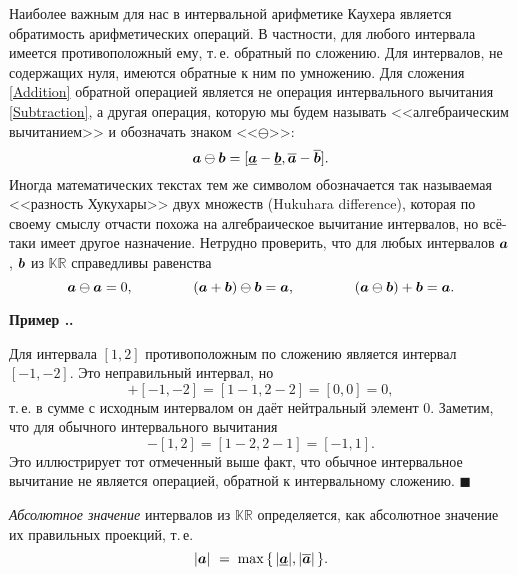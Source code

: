 \documentclass[a5paper,openany]{book}
\newcommand{\mbf}[1]{\protect\text{\boldmath$#1$}}
\newcommand{\mbb}{\mathbb}
\newcommand{\ov}{\overline}
\newcommand{\un}{\underline}
\newcounter{ExmpNum}[section]
\renewcommand{\theExmpNum}{\thesection.\arabic{ExmpNum}}
\newenvironment{example}%
  {\refstepcounter{ExmpNum}%
  \par\addvspace{\medskipamount} 
  \noindent\textbf{Пример {\theExmpNum}.}
  }%
  {\hfill$\blacksquare$\par\medskip}
\begin{document}
Наиболее важным для нас в интервальной арифметике Каухера является обратимость 
арифметических операций. В частности, для любого интервала имеется противоположный ему, 
т.\,е. обратный по сложению. Для интервалов, не содержащих нуля, имеются обратные к ним 
по умножению. Для сложения \eqref{Addition} обратной операцией является не операция 
интервального вычитания \eqref{Subtraction}, а другая операция, которую мы будем 
называть <<алгебраическим вычитанием>> и обозначать знаком <<$\ominus$>>: 
\begin{equation}
\label{AlgebrMinus} 
\mbf{a}\ominus\mbf{b} 
  = [\un{\mbf{a}} - \un{\mbf{b}}, \ov{\mbf{a}} - \ov{\mbf{b}}].
\end{equation} 
Иногда математических текстах тем же символом обозначается так называемая <<разность 
Хукухары>> двух множеств (Hukuhara difference), которая по своему смыслу отчасти 
похожа на алгебраическое вычитание интервалов, но всё-таки имеет другое назначение. 
Нетрудно проверить, что для любых интервалов $\mbf{a}$, $\mbf{b}$ из $\mbb{KR}$ 
справедливы равенства 
\begin{equation*} 
\mbf{a}\ominus\mbf{a} = 0,  \hspace{15mm} 
(\mbf{a} + \mbf{b})\ominus\mbf{b} = \mbf{a}, \hspace{15mm} 
(\mbf{a}\ominus\mbf{b}) + \mbf{b} = \mbf{a}. 
\end{equation*} 
   
  
\begin{example} 
Для интервала $[1, 2]$ противоположным по сложению является интервал $[-1, -2]$. 
Это неправильный интервал, но 
\begin{equation*} 
[1, 2] + [-1, -2] = [1-1, 2-2] = [0, 0] = 0,   
\end{equation*} 
т.\,е. в сумме с исходным интервалом он даёт нейтральный элемент $0$. Заметим, 
что для обычного интервального вычитания 
\begin{equation*} 
[1, 2] - [1, 2] = [1-2, 2-1] = [-1, 1]. 
\end{equation*} 
Это иллюстрирует тот отмеченный выше факт, что обычное интервальное вычитание 
не является операцией, обратной к интервальному сложению. 
\end{example} 
   
\emph{Абсолютное значение} интервалов из $\mbb{KR}$ определяется, как абсолютное 
значение их правильных проекций, т.\,е. 
\begin{equation*} 
|\mbf{a}|\  = \;\max\,\{\,|\un{\mbf{a}}|, |\ov{\mbf{a}}|\,\}.  
\end{equation*} 
   
\end{document}
